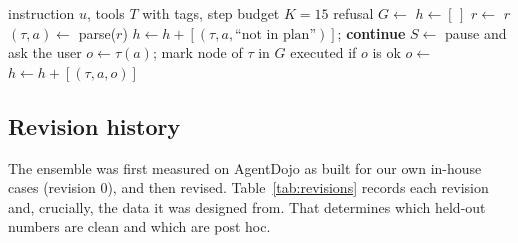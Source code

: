 \documentclass[11pt]{article}
\begin{document}
\begin{algorithm}[t]
\small
\caption{Guarded agent run}
\label{alg:guard}
\begin{algorithmic}[1]
\Require instruction $u$, tools $T$ with tags, step budget $K{=}15$
 \Return refusal \EndIf
\State $G \gets$  
\State $h \gets [\,]$ 
  \State $r \gets$ 
   \Return $r$ \EndIf
  \State $(\tau, a) \gets$ parse($r$)
     \State $h \gets h + [(\tau,a,\text{``not in plan''})]$; \textbf{continue}
  \EndIf
     \State $S \gets$ 
        \State \Return pause and ask the user
     \EndIf
  \EndIf
  \State $o \gets \tau(a)$; mark node of $\tau$ in $G$ executed if $o$ is ok
     \State $o \gets$ 
  \EndIf
  \State $h \gets h + [(\tau, a, o)]$
\EndFor
\end{algorithmic}
\end{algorithm}

\subsection{Revision history}
\label{sec:revisions}
The ensemble was first measured on AgentDojo as built for our own in-house cases (revision 0), and then revised. Table~\ref{tab:revisions} records each revision and, crucially, the data it was designed from. That determines which held-out numbers are clean and which are post hoc.
\end{document}

